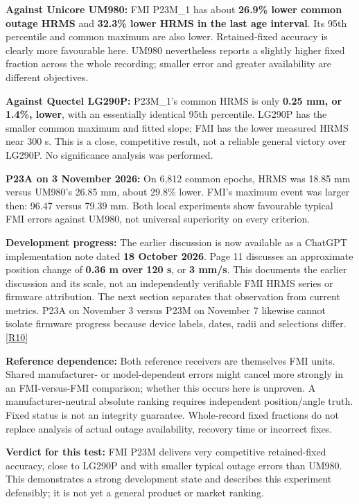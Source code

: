 \documentclass[11pt,a4paper]{article}
\numberwithin{equation}{section}
\numberwithin{figure}{section}
\begin{document}
\textbf{Against Unicore UM980:} FMI P23M\_1 has about \textbf{26.9\% lower common outage HRMS} and \textbf{32.3\% lower HRMS in the last age interval}. Its 95th percentile and common maximum are also lower. Retained-fixed accuracy is clearly more favourable here. UM980 nevertheless reports a slightly higher fixed fraction across the whole recording; smaller error and greater availability are different objectives.

\textbf{Against Quectel LG290P:} P23M\_1's common HRMS is only \textbf{0.25 mm, or 1.4\%, lower}, with an essentially identical 95th percentile. LG290P has the smaller common maximum and fitted slope; FMI has the lower measured HRMS near 300 s. This is a close, competitive result, not a reliable general victory over LG290P. No significance analysis was performed.

\textbf{P23A on 3 November 2026:} On 6,812 common epochs, HRMS was 18.85 mm versus UM980's 26.85 mm, about 29.8\% lower. FMI's maximum event was larger then: 96.47 versus 79.39 mm. Both local experiments show favourable typical FMI errors against UM980, not universal superiority on every criterion.

\textbf{Development progress:} The earlier discussion is now available as a ChatGPT implementation note dated \textbf{18 October 2026}. Page 11 discusses an approximate position change of \textbf{0.36 m over 120 s}, or \textbf{3 mm/\allowbreak{}s}. This documents the earlier discussion and its scale, not an independently verifiable FMI HRMS series or firmware attribution. The next section separates that observation from current metrics. P23A on November 3 versus P23M on November 7 likewise cannot isolate firmware progress because device labels, dates, radii and selections differ. \hyperlink{ref-R10}{[R10]}

\textbf{Reference dependence:} Both reference receivers are themselves FMI units. Shared manufacturer- or model-dependent errors might cancel more strongly in an FMI-versus-FMI comparison; whether this occurs here is unproven. A manufacturer-neutral absolute ranking requires independent position/\allowbreak{}angle truth. Fixed status is not an integrity guarantee. Whole-record fixed fractions do not replace analysis of actual outage availability, recovery time or incorrect fixes.

\textbf{Verdict for this test:} FMI P23M delivers very competitive retained-fixed accuracy, close to LG290P and with smaller typical outage errors than UM980. This demonstrates a strong development state and describes this experiment defensibly; it is not yet a general product or market ranking.
\end{document}
